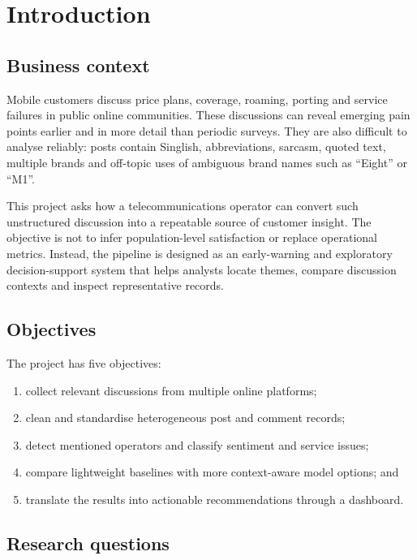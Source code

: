 \documentclass[11pt,a4paper]{article}
\begin{document}
\tableofcontents
\newpage

\section{Introduction}

\subsection{Business context}

Mobile customers discuss price plans, coverage, roaming, porting and service failures in public online communities. These discussions can reveal emerging pain points earlier and in more detail than periodic surveys. They are also difficult to analyse reliably: posts contain Singlish, abbreviations, sarcasm, quoted text, multiple brands and off-topic uses of ambiguous brand names such as ``Eight'' or ``M1''.

This project asks how a telecommunications operator can convert such unstructured discussion into a repeatable source of customer insight. The objective is not to infer population-level satisfaction or replace operational metrics. Instead, the pipeline is designed as an early-warning and exploratory decision-support system that helps analysts locate themes, compare discussion contexts and inspect representative records.

\subsection{Objectives}

The project has five objectives:

\begin{enumerate}
  \item collect relevant discussions from multiple online platforms;
  \item clean and standardise heterogeneous post and comment records;
  \item detect mentioned operators and classify sentiment and service issues;
  \item compare lightweight baselines with more context-aware model options; and
  \item translate the results into actionable recommendations through a dashboard.
\end{enumerate}

\subsection{Research questions}
\end{document}
